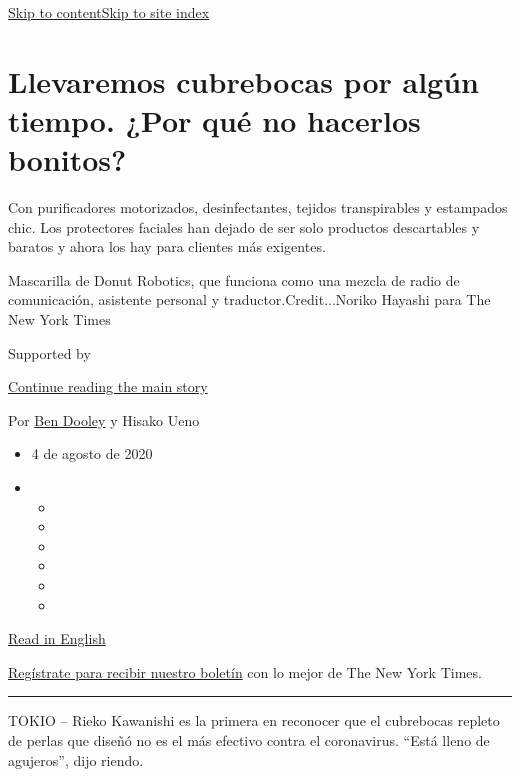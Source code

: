 \protect\hyperlink{site-content}{Skip to
content}\protect\hyperlink{site-index}{Skip to site index}

\hypertarget{llevaremos-cubrebocas-por-alguxfan-tiempo-por-quuxe9-no-hacerlos-bonitos}{%
\section{Llevaremos cubrebocas por algún tiempo. ¿Por qué no hacerlos
bonitos?}\label{llevaremos-cubrebocas-por-alguxfan-tiempo-por-quuxe9-no-hacerlos-bonitos}}

Con purificadores motorizados, desinfectantes, tejidos transpirables y
estampados chic. Los protectores faciales han dejado de ser solo
productos descartables y baratos y ahora los hay para clientes más
exigentes.

Mascarilla de Donut Robotics, que funciona como una mezcla de radio de
comunicación, asistente personal y traductor.Credit...Noriko Hayashi
para The New York Times

Supported by

\protect\hyperlink{after-sponsor}{Continue reading the main story}

Por \href{https://www.nytimes.com/by/ben-dooley}{Ben Dooley} y Hisako
Ueno

\begin{itemize}
\item
  4 de agosto de 2020
\item
  \begin{itemize}
  \item
  \item
  \item
  \item
  \item
  \item
  \end{itemize}
\end{itemize}

\href{https://www.nytimes.com/2020/07/27/business/fashion-masks-coronavirus.html}{Read
in English}

\href{https://www.nytimes.com/newsletters/el-times}{Regístrate para
recibir nuestro boletín} con lo mejor de The New York Times.

\begin{center}\rule{0.5\linewidth}{\linethickness}\end{center}

TOKIO -- Rieko Kawanishi es la primera en reconocer que el cubrebocas
repleto de perlas que diseñó no es el más efectivo contra el
coronavirus. ``Está lleno de agujeros'', dijo riendo.

